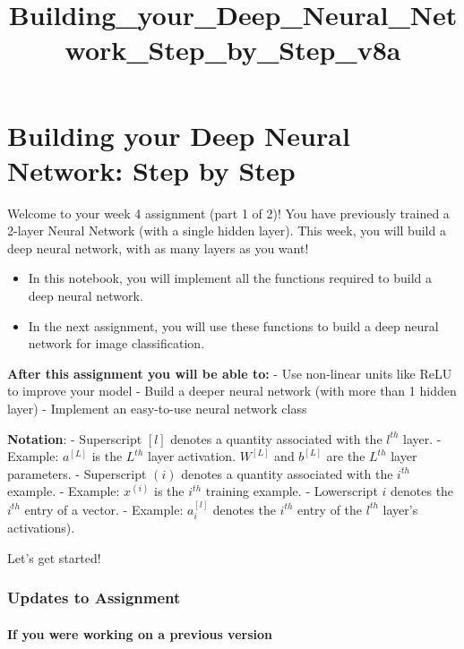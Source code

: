 \documentclass[11pt]{article}
\title{Building\_your\_Deep\_Neural\_Network\_Step\_by\_Step\_v8a}
\begin{document}
    
    
    \maketitle
    
    

    
    \section{Building your Deep Neural Network: Step by
Step}\label{building-your-deep-neural-network-step-by-step}

Welcome to your week 4 assignment (part 1 of 2)! You have previously
trained a 2-layer Neural Network (with a single hidden layer). This
week, you will build a deep neural network, with as many layers as you
want!

\begin{itemize}
\itemsep1pt\parskip0pt
\item
  In this notebook, you will implement all the functions required to
  build a deep neural network.
\item
  In the next assignment, you will use these functions to build a deep
  neural network for image classification.
\end{itemize}

\textbf{After this assignment you will be able to:} - Use non-linear
units like ReLU to improve your model - Build a deeper neural network
(with more than 1 hidden layer) - Implement an easy-to-use neural
network class

\textbf{Notation}: - Superscript $[l]$ denotes a quantity associated
with the $l^{th}$ layer. - Example: $a^{[L]}$ is the $L^{th}$ layer
activation. $W^{[L]}$ and $b^{[L]}$ are the $L^{th}$ layer parameters. -
Superscript $(i)$ denotes a quantity associated with the $i^{th}$
example. - Example: $x^{(i)}$ is the $i^{th}$ training example. -
Lowerscript $i$ denotes the $i^{th}$ entry of a vector. - Example:
$a^{[l]}_i$ denotes the $i^{th}$ entry of the $l^{th}$ layer's
activations).

Let's get started!

    \subsubsection{ Updates to Assignment }\label{updates-to-assignment}

\paragraph{If you were working on a previous
version}\label{if-you-were-working-on-a-previous-version}
\end{document}
